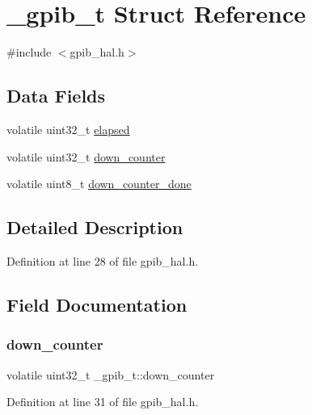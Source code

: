 \hypertarget{struct__gpib__t}{}\section{\+\_\+gpib\+\_\+t Struct Reference}
\label{struct__gpib__t}


{\ttfamily \#include $<$gpib\+\_\+hal.\+h$>$}

\subsection*{Data Fields}
\begin{DoxyCompactItemize}
\item 
volatile uint32\+\_\+t \hyperlink{struct__gpib__t_a99a38aef880eb075f625f33d7bac31dd}{elapsed}
\item 
volatile uint32\+\_\+t \hyperlink{struct__gpib__t_a21ed3be06f76b0a5237b5e64bc2e8793}{down\+\_\+counter}
\item 
volatile uint8\+\_\+t \hyperlink{struct__gpib__t_af2622dd8668ecb24c42a2da2d8956538}{down\+\_\+counter\+\_\+done}
\end{DoxyCompactItemize}


\subsection{Detailed Description}


Definition at line 28 of file gpib\+\_\+hal.\+h.



\subsection{Field Documentation}
\mbox{\label{struct__gpib__t_a21ed3be06f76b0a5237b5e64bc2e8793}} 
\subsubsection{\texorpdfstring{down\+\_\+counter}{down\_counter}}
{\footnotesize\ttfamily volatile uint32\+\_\+t \+\_\+gpib\+\_\+t\+::down\+\_\+counter}



Definition at line 31 of file gpib\+\_\+hal.\+h.



